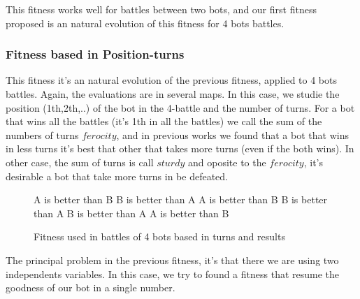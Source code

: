 \documentclass{llncs}
\begin{document}
This fitness works well for battles between two bots, and our first fitness proposed is an natural evolution of this fitness for 4 bots battles.


\subsubsection{Fitness based in Position-turns}

This fitness it's an natural evolution of the previous fitness, applied to 4 bots battles. Again, the evaluations are in several maps. In this case, we studie the position (1th,2th,..) of the bot in the 4-battle and the number of turns. For a bot that wins all the battles (it's 1th in all the battles) we call the sum of the numbers of turns {$ferocity$}, and in previous works we found that a bot that wins in less turns it's best that other that takes more turns (even if the both wins). In other case, the sum of turns is call {$sturdy$} and oposite to the {$ferocity$}, it's desirable a bot that take more turns in be defeated.

\begin{figure}
\begin{algorithmic}
    \State A is better than B
    \State B is better than A
\Else
            \State A is better than B
        \Else
            \State B is better than A
        \EndIf
    \Else
            \State B is better than A
        \Else
            \State A is better than B
        \EndIf
    \EndIf
\EndIf
\end{algorithmic}
\caption{Fitness used in battles of 4 bots based in turns and results}
\label{fig:fitness_co_clasico}
\end{figure}



The principal problem in the previous fitness, it's that there we are using two independents variables. In this case, we try to found a fitness that resume the goodness of our bot in a single number. %
\end{document}
